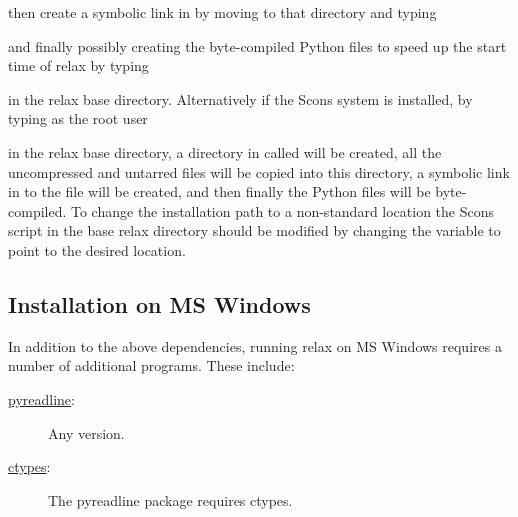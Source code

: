 
then create a symbolic link in  by moving to that directory and typing


and finally possibly creating the byte-compiled Python  files to speed up the start time of relax by typing


in the relax base directory.
Alternatively if the Scons system is installed, by typing as the root user


in the relax base directory, a directory in  called  will be created, all the uncompressed and untarred files will be copied into this directory, a symbolic link in  to the file  will be created, and then finally the Python  files will be byte-compiled.
To change the installation path to a non-standard location the Scons script  in the base relax directory should be modified by changing the variable  to point to the desired location.



\subsection{Installation on MS Windows}

In addition to the above dependencies, running relax on MS Windows requires a number of additional programs.
These include:
\begin{description}
  \item[\href{https://pypi.python.org/pypi/pyreadline}{pyreadline}:]  Any version.
  \item[\href{http://starship.python.net/crew/theller/ctypes/}{ctypes}:]  The pyreadline package requires ctypes.
\end{description}


